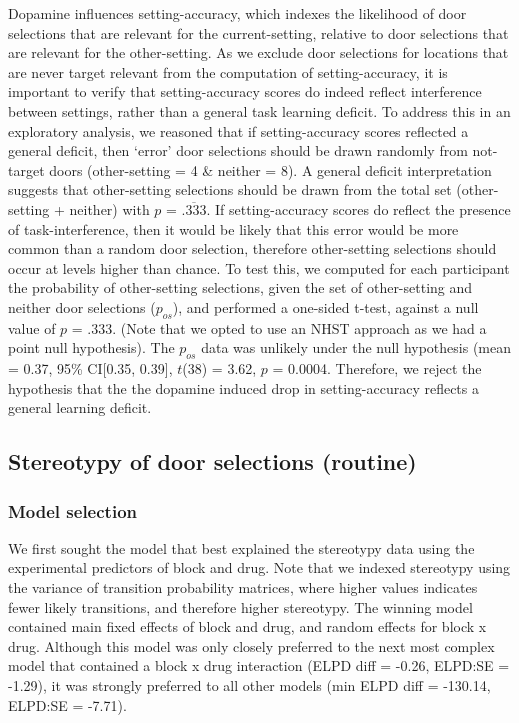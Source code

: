 \documentclass[
  man]{apa6}
\begin{document}
Dopamine influences setting-accuracy, which indexes the likelihood of door selections that are relevant for the current-setting, relative to door selections that are relevant for the other-setting. As we exclude door selections for locations that are never target relevant from the computation of setting-accuracy, it is important to verify that setting-accuracy scores do indeed reflect interference between settings, rather than a general task learning deficit. To address this in an exploratory analysis, we reasoned that if setting-accuracy scores reflected a general deficit, then `error' door selections should be drawn randomly from not-target doors (other-setting = 4 \& neither = 8). A general deficit interpretation suggests that other-setting selections should be drawn from the total set (other-setting + neither) with \(p\) = \(\overline{.333}\). If setting-accuracy scores do reflect the presence of task-interference, then it would be likely that this error would be more common than a random door selection, therefore other-setting selections should occur at levels higher than chance. To test this, we computed for each participant the probability of other-setting selections, given the set of other-setting and neither door selections (\(p_{os}\)), and performed a one-sided t-test, against a null value of \(p\) = .333. (Note that we opted to use an NHST approach as we had a point null hypothesis). The \(p_{os}\) data was unlikely under the null hypothesis (mean = 0.37, 95\% CI{[}0.35, 0.39{]}, \(t\)(38) = 3.62, \(p\) = 0.0004. Therefore, we reject the hypothesis that the the dopamine induced drop in setting-accuracy reflects a general learning deficit.

\hypertarget{stereotypy-of-door-selections-routine}{%
\subsection{Stereotypy of door selections (routine)}\label{stereotypy-of-door-selections-routine}}

\label{sec:Stereotypy Results}

\hypertarget{model-selection-2}{%
\subsubsection{Model selection}\label{model-selection-2}}

We first sought the model that best explained the stereotypy data using the experimental predictors of block and drug. Note that we indexed stereotypy using the variance of transition probability matrices, where higher values indicates fewer likely transitions, and therefore higher stereotypy. The winning model contained main fixed effects of block and drug, and random effects for block x drug. Although this model was only closely preferred to the next most complex model that contained a block x drug interaction (ELPD diff = -0.26, ELPD:SE = -1.29), it was strongly preferred to all other models (min ELPD diff = -130.14, ELPD:SE = -7.71).
\end{document}
